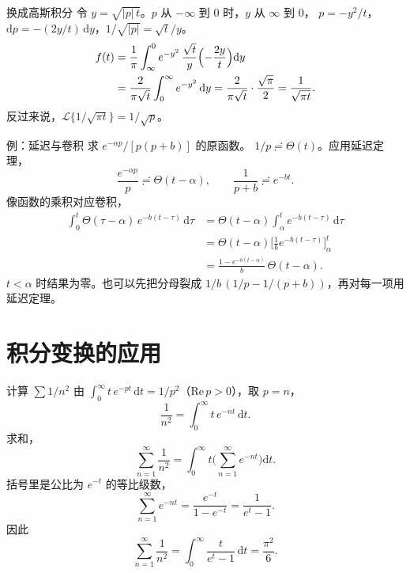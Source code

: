 \documentclass[fontset=windows, chinese, 10pt, xcolor=dvipsnames]{beamer}
\begin{document}
\begin{frame}{换成高斯积分}
  令 $y=\sqrt{|p|\,t}$。$p$ 从 $-\infty$ 到 $0$ 时，$y$ 从 $\infty$ 到 $0$，
  $p=-y^2/t$，$\mathrm{d}p=-(2y/t)\,\mathrm{d}y$，$1/\sqrt{|p|}=\sqrt{t}/y$。
  \begin{align*}
    f(t)
    &=\frac{1}{\pi}\int_{\infty}^{0}
      e^{-y^2}\,\frac{\sqrt{t}}{y}
      \Bigl(-\frac{2y}{t}\Bigr)\mathrm{d}y \\
    &=\frac{2}{\pi\sqrt{t}}\int_0^{\infty} e^{-y^2}\,\mathrm{d}y
     =\frac{2}{\pi\sqrt{t}}\cdot\frac{\sqrt{\pi}}{2}
     =\frac{1}{\sqrt{\pi t}}.
  \end{align*}
  反过来说，$\mathcal{L}\{1/\sqrt{\pi t}\}=1/\sqrt{p}$。
\end{frame}

\begin{frame}{例：延迟与卷积}
  求 $e^{-\alpha p}/[p(p+b)]$ 的原函数。
  $1/p\risingdotseq\Theta(t)$。应用延迟定理，
  \begin{equation*}
    \frac{e^{-\alpha p}}{p}\risingdotseq\Theta(t-\alpha),
    \qquad
    \frac{1}{p+b}\risingdotseq e^{-bt}.
  \end{equation*}
  像函数的乘积对应卷积，
  \begin{align*}
    \int_0^t\Theta(\tau-\alpha)\,e^{-b(t-\tau)}\,\mathrm{d}\tau
    &=\Theta(t-\alpha)\int_{\alpha}^{t} e^{-b(t-\tau)}\,\mathrm{d}\tau \\
    &=\Theta(t-\alpha)
      \Biggl[\frac{1}{b}e^{-b(t-\tau)}\Biggr]_{\alpha}^{t} \\
    &=\frac{1-e^{-b(t-\alpha)}}{b}\,\Theta(t-\alpha).
  \end{align*}
  $t<\alpha$ 时结果为零。也可以先把分母裂成 $1/b\,(1/p-1/(p+b))$，再对每一项用延迟定理。
\end{frame}

\section{积分变换的应用}

\begin{frame}{计算 $\sum 1/n^2$}
  由 $\displaystyle\int_0^{\infty} t\,e^{-pt}\,\mathrm{d}t=1/p^2$（$\mathrm{Re}\,p>0$），取 $p=n$，
  \begin{equation*}
    \frac{1}{n^2}=\int_0^{\infty} t\,e^{-nt}\,\mathrm{d}t.
  \end{equation*}
  求和，
  \begin{equation*}
    \sum_{n=1}^{\infty}\frac{1}{n^2}
    =\int_0^{\infty} t\Biggl(\sum_{n=1}^{\infty} e^{-nt}\Biggr)\mathrm{d}t.
  \end{equation*}
  括号里是公比为 $e^{-t}$ 的等比级数，
  \begin{equation*}
    \sum_{n=1}^{\infty} e^{-nt}
    =\frac{e^{-t}}{1-e^{-t}}
    =\frac{1}{e^{t}-1}.
  \end{equation*}
  因此
  \begin{equation*}
    \sum_{n=1}^{\infty}\frac{1}{n^2}
    =\int_0^{\infty}\frac{t}{e^{t}-1}\,\mathrm{d}t
    =\frac{\pi^2}{6}.
  \end{equation*}
\end{frame}
\end{document}
